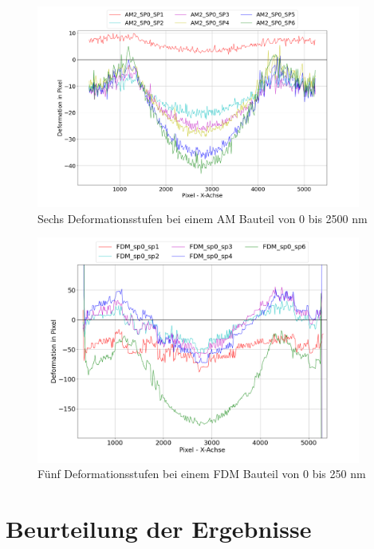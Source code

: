 \begin{figure}[H]
  \centering
  \includegraphics[width=0.95\textwidth]{images/am2_all_defos.png}
  \caption{Sechs Deformationsstufen bei einem AM Bauteil von 0 bis 2500 nm}
  \label{fig:am_defos}
\end{figure}

\begin{figure}[H]
  \centering
  \includegraphics[width=0.95\textwidth]{images/fdm2_all_defos.png}
  \caption{Fünf Deformationsstufen bei einem FDM Bauteil von 0 bis 250 nm}
  \label{fig:fdm_defos}
\end{figure}

\section{Beurteilung der Ergebnisse}


